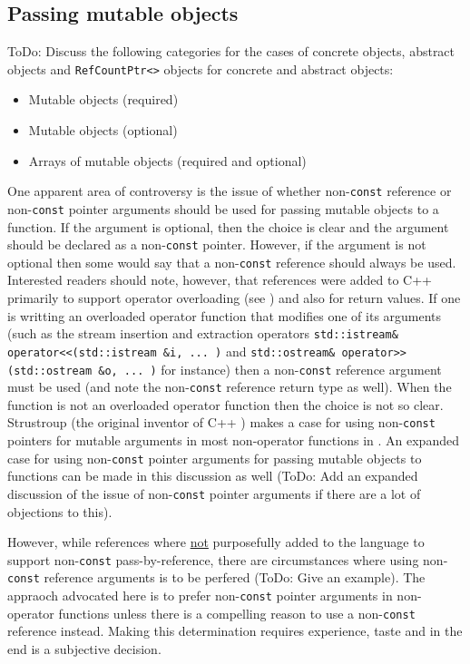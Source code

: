 %
\subsection{Passing mutable objects}
%

ToDo: Discuss the following categories for the cases of concrete
objects, abstract objects and {}\texttt{Ref\-Count\-Ptr<>} objects for
concrete and abstract objects:

\begin{itemize}
\item Mutable objects (required)
\item Mutable objects (optional)
\item Arrays of mutable objects (required and optional)
\end{itemize}

One apparent area of controversy is the issue of whether
non-\texttt{const} reference or non-\texttt{const} pointer arguments
should be used for passing mutable objects to a function.  If the
argument is optional, then the choice is clear and the argument should
be declared as a non-\texttt{const} pointer.  However, if the argument
is not optional then some would say that a non-\texttt{const}
reference should always be used.  Interested readers should note,
however, that references were added to C++ primarily to support
operator overloading (see {}\cite[Section 3.7]{ref:design_evol_cpp})
and also for return values.  If one is writting an overloaded operator
function that modifies one of its arguments (such as the stream
insertion and extraction operators {}\texttt{std::istream\&
operator<<(std::istream
\&i, ... )} and {}\texttt{std::ostream\& operator>>(std::ostream \&o,
... )} for instance) then a non-\texttt{const} reference argument must
be used (and note the non-\texttt{const} reference return type as
well).  When the function is not an overloaded operator function then
the choice is not so clear.  Strustroup (the original inventor of C++
{}\cite{ref:design_evol_cpp}) makes a case for using
non-\texttt{const} pointers for mutable arguments in most non-operator
functions in {}\cite[Section 5.5]{ref:stroustrup_2000}.  An expanded
case for using non-\texttt{const} pointer arguments for passing
mutable objects to functions can be made in this discussion as well
(ToDo: Add an expanded discussion of the issue of non-\texttt{const}
pointer arguments if there are a lot of objections to this).

However, while references where {}\underline{not} purposefully added
to the language to support non-\texttt{const} pass-by-reference, there
are circumstances where using non-\texttt{const} reference arguments
is to be perfered (ToDo: Give an example).  The appraoch advocated
here is to prefer non-\texttt{const} pointer arguments in non-operator
functions unless there is a compelling reason to use a
non-\texttt{const} reference instead.  Making this determination
requires experience, taste and in the end is a subjective decision.

